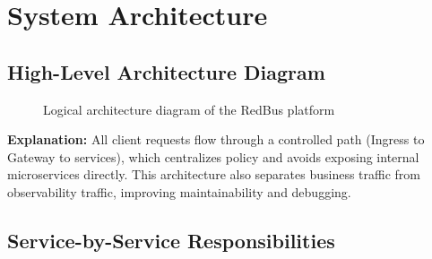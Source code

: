 \documentclass[12pt,a4paper]{article}
\begin{document}
\section{System Architecture}

\subsection{High-Level Architecture Diagram}

\begin{figure}[H]
\centering
{}
\caption{Logical architecture diagram of the RedBus platform}
\end{figure}
\textbf{Explanation:} All client requests flow through a controlled path (Ingress to Gateway to services), which centralizes policy and avoids exposing internal microservices directly. This architecture also separates business traffic from observability traffic, improving maintainability and debugging.

\subsection{Service-by-Service Responsibilities}
\end{document}
